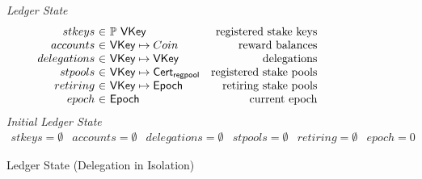\documentclass[11pt,a4paper]{article}
\newcommand{\powerset}[1]{\mathbb{P}~#1}
\newcommand{\type}[1]{\mathsf{#1}}
\begin{document}
\begin{figure}

\emph{Ledger State}
%
\begin{equation*}
\begin{array}{r@{~\in~}lr}
stkeys & \powerset{\type{VKey}} & \text{registered stake keys}
\\
accounts & \type{VKey} \mapsto Coin & \text{reward balances}
\\
delegations & \type{VKey} \mapsto \type{VKey} & \text{delegations}
\\
stpools & \type{VKey} \mapsto \type{Cert_{regpool}} & \text{registered stake pools}
\\
retiring & \type{VKey} \mapsto \type{Epoch} & \text{retiring stake pools}
\\
epoch & \type{Epoch} & \text{current epoch}

\end{array}
\end{equation*}
%
\emph{Initial Ledger State}
%
\begin{equation*}
\begin{array}{llllll}
stkeys = \emptyset
  & accounts = \emptyset
  & delegations = \emptyset
  & stpools = \emptyset
  & retiring = \emptyset
  & epoch = 0
\end{array}
\end{equation*}

\caption{Ledger State (Delegation in Isolation)}
\label{fig:delegation_ledger_state}
\end{figure}

\end{document}
